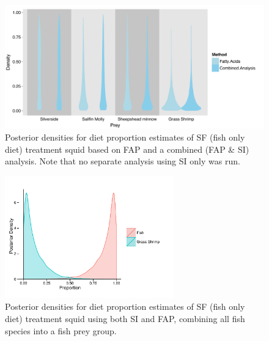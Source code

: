 \documentclass{article}%
\begin{document}
\begin{spacing}{1.9}
\begin{flushleft}
\begin{figure}
  \begin{center}
    \includegraphics[width=1\textwidth]{figures/SF_comp_plot.pdf}   
    \caption{Posterior densities for diet proportion estimates of SF
      (fish only diet) treatment squid based on FAP and a combined
      (FAP \& SI) analysis. Note that no separate analysis using SI
      only was run.}
    \label{fig:pop_comp_SF}
  \end{center}
\end{figure}

\begin{figure}
  \begin{center}
    \includegraphics[width=0.65\textwidth]{figures/Fish_plot.pdf}   
    \caption{Posterior densities for diet proportion estimates of SF
      (fish only diet) treatment squid using both SI and FAP,
      combining all fish species into a fish prey group.}
    \label{fig:Fish_plot}
  \end{center}
\end{figure}






\end{flushleft}
\end{spacing}
\end{document}
